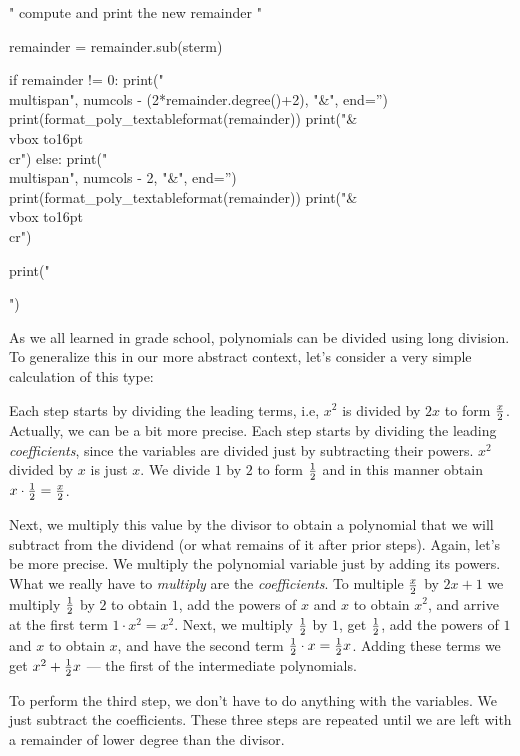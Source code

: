 \begin{sympycode}
{{      " compute and print the new remainder "

      remainder = remainder.sub(sterm)

      if remainder != 0:
         print("\\multispan{", numcols - (2*remainder.degree()+2), "}&", end='')
         print(format_poly_textableformat(remainder))
         print("&\\vbox to16pt{}\\cr")
      else:
         print("\\multispan{", numcols - 2, "}&", end='')
         print(format_poly_textableformat(remainder))
         print("&\\vbox to16pt{}\\cr")

   print("}}")
\end{sympycode}

As we all learned in grade school, polynomials can be divided
using long division.  To generalize this in our more abstract
context, let's consider a very simple calculation of this type:


Each step starts by dividing the leading terms, i.e, $x^2$ is divided
by $2x$ to form $x\over 2$.  Actually, we can be a bit more precise.
Each step starts by dividing the leading {\it coefficients},
since the variables are divided just by subtracting their
powers. $x^2$ divided by $x$ is just $x$.  We divide $1$ by $2$
to form $1\over2$ and in this manner obtain $x\cdot{1\over2}={x\over2}$.

Next, we multiply this value by the divisor to obtain a polynomial
that we will subtract from the dividend (or what remains of it after
prior steps).  Again, let's be more precise.  We multiply the
polynomial variable just by adding its powers.  What we really have to
{\it multiply} are the {\it coefficients}.  To multiple $x\over2$ by
$2x+1$ we multiply $1\over2$ by $2$ to obtain $1$, add the powers of
$x$ and $x$ to obtain $x^2$, and arrive at the first term $1\cdot
x^2=x^2$.  Next, we multiply $1\over2$ by $1$, get $1\over2$, add the
powers of $1$ and $x$ to obtain $x$, and have the second term
${1\over2}\cdot x={1\over2}x$.  Adding these terms we get
$x^2+{1\over2}x$ --- the first of the intermediate polynomials.

To perform the third step, we don't have to do anything with
the variables.  We just subtract the coefficients.  These
three steps are repeated until we are left with a remainder
of lower degree than the divisor.

